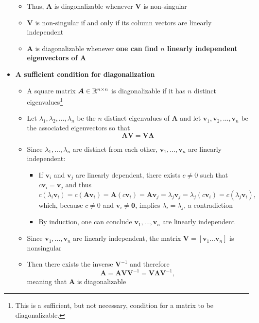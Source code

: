 \documentclass[12pt,a4paper]{article}
\begin{document}
\begin{itemize}
\begin{itemize}
  \item Thus, $\bm{A}$ is diagonalizable whenever $\bm{V}$ is non-singular
  \item $\bm{V}$ is non-singular if and only if its column vectors are linearly independent
  \item $\bm{A}$ is diagonalizable whenever \textbf{one can find $n$ linearly independent eigenvectors of $\bm{A}$}
  \end{itemize}

\item \textbf{A sufficient condition for diagonalization}
  \begin{itemize}
  \item A square matrix $\bm{A}\in \mathbb{R}^{n\times n}$ is diagonalizable
    if it has $n$ distinct eigenvalues\footnote{%
      This is a sufficient, but not necessary, condition for a matrix to be diagonalizable.
    }
  \item Let $\lambda_{1},\lambda_{2},\ldots, \lambda_{n}$ be the $n$ distinct eigenvalues of $\bm{A}$
    and let $\bm{v}_{1}, \bm{v}_{2}, \ldots, \bm{v}_{n}$ be the associated eigenvectors
    so that
    \begin{equation}\nonumber%
      \bm{A}\bm{V} = \bm{V}\bm{\Lambda}
    \end{equation}
  \item Since $\lambda_{1},\ldots, \lambda_{n}$ are distinct from each other,
    $\bm{v}_{1}, \ldots, \bm{v}_{n}$ are linearly independent:
    \begin{itemize}
    \item If $\bm{v}_{i}$ and $\bm{v}_{j}$ are linearly dependent,
      there exists $c\neq 0$ such that $c\bm{v}_{i}=\bm{v}_{j}$ and thus
      \begin{equation}\nonumber%
        c(\lambda_{i}\bm{v}_{i}) =
        c(\bm{A}\bm{v}_{i}) = 
        \bm{A}(c\bm{v}_{i}) = 
        \bm{A}\bm{v}_{j} = 
        \lambda_{j}\bm{v}_{j} = 
        \lambda_{j}(c\bm{v}_{i}) =
        c(\lambda_{j}\bm{v}_{i}),
      \end{equation}
      which, because $c\neq 0$ and $\bm{v}_{i}\neq \bm{0}$, implies $\lambda_{i}=\lambda_{j}$, a contradiction
    \item By induction, one can conclude $\bm{v}_{1}, \ldots, \bm{v}_{n}$ are linearly independent
    \end{itemize}
  \item Since $\bm{v}_{1}, \ldots, \bm{v}_{n}$ are linearly independent,
    the matrix $\bm{V}=[\bm{v}_{1}\ldots \bm{v}_{n}]$ is nonsingular
  \item Then there exists the inverse $\bm{V}^{-1}$ and therefore
    \begin{equation}\nonumber%
      \bm{A} = \bm{A}\bm{V}\bm{V}^{-1} = \bm{V}\bm{\Lambda}\bm{V}^{-1},
    \end{equation}
    meaning that $\bm{A}$ is diagonalizable
  \end{itemize}


\end{itemize}
\end{document}
